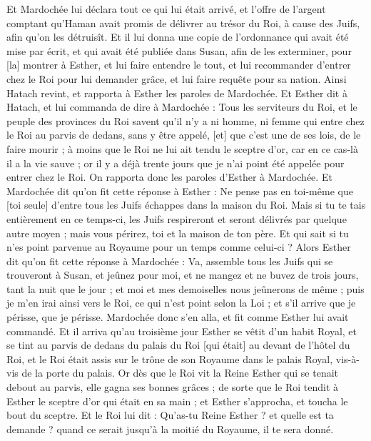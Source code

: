 \begin{multicols}{2}
Et Mardochée lui déclara tout ce qui lui était arrivé, et l'offre de l'argent comptant qu'Haman avait promis de délivrer au trésor du Roi, à cause des Juifs, afin qu'on les détruisît.
Et il lui donna une copie de l'ordonnance qui avait été mise par écrit, et qui avait été publiée dans Susan, afin de les exterminer, pour [la] montrer à Esther, et lui faire entendre le tout, et lui recommander d'entrer chez le Roi pour lui demander grâce, et lui faire requête pour sa nation.
Ainsi Hatach revint, et rapporta à Esther les paroles de Mardochée.
Et Esther dit à Hatach, et lui commanda de dire à Mardochée :
Tous les serviteurs du Roi, et le peuple des provinces du Roi savent qu'il n'y a ni homme, ni femme qui entre chez le Roi au parvis de dedans, sans y être appelé, [et] que c'est une de ses lois, de le faire mourir ; à moins que le Roi ne lui ait tendu le sceptre d'or, car en ce cas-là il a la vie sauve ; or il y a déjà trente jours que je n'ai point été appelée pour entrer chez le Roi.
On rapporta donc les paroles d'Esther à Mardochée.
Et Mardochée dit qu'on fit cette réponse à Esther : Ne pense pas en toi-même que [toi seule] d'entre tous les Juifs échappes dans la maison du Roi.
Mais si tu te tais entièrement en ce temps-ci, les Juifs respireront et seront délivrés par quelque autre moyen ; mais vous périrez, toi et la maison de ton père. Et qui sait si tu n'es point parvenue au Royaume pour un temps comme celui-ci ?
Alors Esther dit qu'on fit cette réponse à Mardochée :
Va, assemble tous les Juifs qui se trouveront à Susan, et jeûnez pour moi, et ne mangez et ne buvez de trois jours, tant la nuit que le jour ; et moi et mes demoiselles nous jeûnerons de même ; puis je m'en irai ainsi vers le Roi, ce qui n'est point selon la Loi ; et s'il arrive que je périsse, que je périsse.
Mardochée donc s'en alla, et fit comme Esther lui avait commandé.
\VerseOne{}Et il arriva qu'au troisième jour Esther se vêtit d'un habit Royal, et se tint au parvis de dedans du palais du Roi [qui était] au devant de l'hôtel du Roi, et le Roi était assis sur le trône de son Royaume dans le palais Royal, vis-à-vis de la porte du palais.
Or dès que le Roi vit la Reine Esther qui se tenait debout au parvis, elle gagna ses bonnes grâces ; de sorte que le Roi tendit à Esther le sceptre d'or qui était en sa main ; et Esther s'approcha, et toucha le bout du sceptre.
Et le Roi lui dit : Qu'as-tu Reine Esther ? et quelle est ta demande ? quand ce serait jusqu'à la moitié du Royaume, il te sera donné.

\end{multicols}
